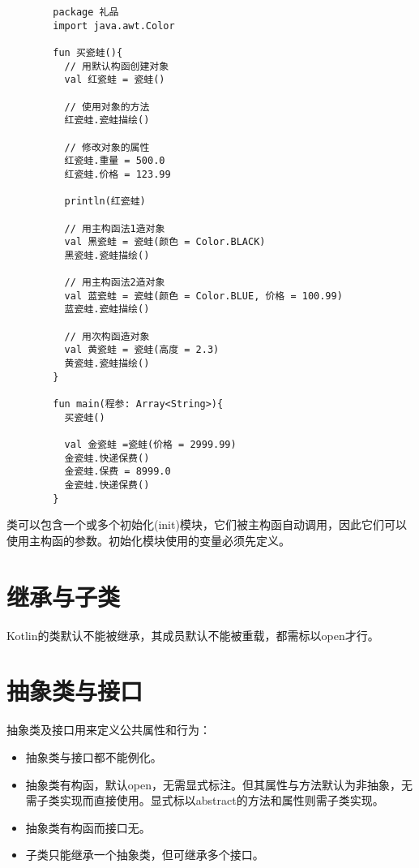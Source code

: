     \begin{verbatim}
        package 礼品
        import java.awt.Color
        
        fun 买瓷蛙(){
          // 用默认构函创建对象
          val 红瓷蛙 = 瓷蛙()
        
          // 使用对象的方法
          红瓷蛙.瓷蛙描绘()
        
          // 修改对象的属性
          红瓷蛙.重量 = 500.0
          红瓷蛙.价格 = 123.99
        
          println(红瓷蛙)
        
          // 用主构函法1造对象
          val 黑瓷蛙 = 瓷蛙(颜色 = Color.BLACK)
          黑瓷蛙.瓷蛙描绘()
        
          // 用主构函法2造对象
          val 蓝瓷蛙 = 瓷蛙(颜色 = Color.BLUE, 价格 = 100.99)
          蓝瓷蛙.瓷蛙描绘()
        
          // 用次构函造对象
          val 黄瓷蛙 = 瓷蛙(高度 = 2.3)
          黄瓷蛙.瓷蛙描绘()
        }
        
        fun main(程参: Array<String>){
          买瓷蛙()
        
          val 金瓷蛙 =瓷蛙(价格 = 2999.99)
          金瓷蛙.快递保费()
          金瓷蛙.保费 = 8999.0
          金瓷蛙.快递保费()
        }

    \end{verbatim}

类可以包含一个或多个初始化(init)模块，它们被主构函自动调用，因此它们可以使用主构函的参数。初始化模块使用的变量必须先定义。

\section{继承与子类}
Kotlin的类默认不能被继承，其成员默认不能被重载，都需标以open才行。

\section{抽象类与接口}
抽象类及接口用来定义公共属性和行为：
\begin{itemize}
    \item 抽象类与接口都不能例化。
    \item 抽象类有构函，默认open，无需显式标注。但其属性与方法默认为非抽象，无需子类实现而直接使用。显式标以abstract的方法和属性则需子类实现。
    \item 抽象类有构函而接口无。
    \item 子类只能继承一个抽象类，但可继承多个接口。
\end{itemize}

